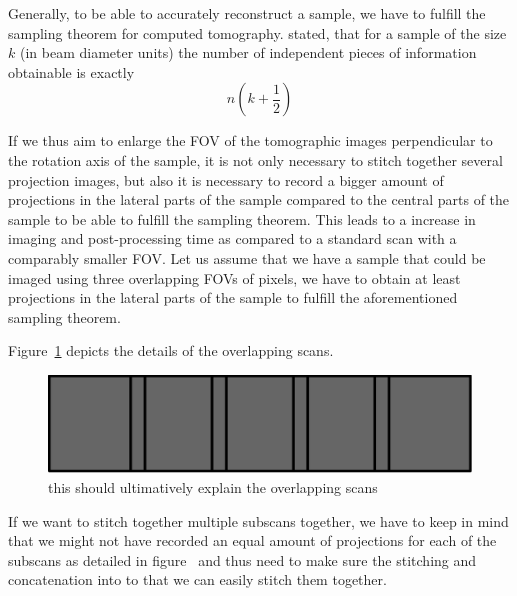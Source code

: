 Generally, to be able to accurately reconstruct a sample, we have to fulfill the sampling theorem for computed tomography. \citet{Cormack1978} stated, that for a sample of the size $k$ (in beam diameter units) the number of independent pieces of information obtainable is exactly
\begin{equation}
n(k+\frac{1}{2})%
\end{equation}

If we thus aim to enlarge the FOV of the tomographic images perpendicular to the rotation axis of the sample, it is not only necessary to stitch together several projection images, but also it is necessary to record a bigger amount of projections in the lateral parts of the sample compared to the central parts of the sample to be able to fulfill the sampling theorem. This leads to a increase in imaging and post-processing time as compared to a standard scan with a comparably smaller FOV. Let us assume that we have a sample that could be imaged using three overlapping FOVs of \unit{}{pixels}, we have to obtain at least \unit{}{projections} in the lateral parts of the sample to fulfill the aforementioned sampling theorem.

Figure~\ref{fig:overlapping scans} depicts the details of the overlapping scans.

\begin{figure}[tb]
	\centering
		\includegraphics[width=\imsize]{img/overlapping-subscans}
	\caption[Overlapping scans]{this should ultimatively explain the overlapping scans}
	\label{fig:overlapping scans}
\end{figure}

If we want to stitch together multiple subscans together, we have to keep in mind that we might not have recorded an equal amount of projections for each of the subscans as detailed in figure~\label{fig:overlapping scans} and thus need to make sure the stitching and concatenation into to that we can easily stitch them together.


